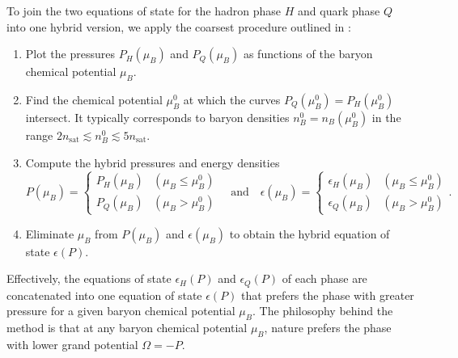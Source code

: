 To join the two equations of state for the hadron phase $H$ and quark phase $Q$ into one hybrid version,
we apply the coarsest procedure outlined in \cite[section V-C]{ref:quark_star_review}:
\begin{enumerate}
\item \label{step:hybrid:one}%
      Plot the pressures $P_H(\mu_B)$ and $P_Q(\mu_B)$ as functions of the baryon chemical potential $\mu_B$.
\item \label{step:hybrid:two}%
      Find the chemical potential $\mu_B^0$ at which the curves $P_Q(\mu_B^0) = P_H(\mu_B^0)$ intersect.
      It typically corresponds to baryon densities $n_B^0 = n_B(\mu_B^0)$ in the range $2 n_\text{sat} \lesssim n_B^0 \lesssim 5 n_\text{sat}$.
\item \label{step:hybrid:three}%
      Compute the hybrid pressures and energy densities
      \begin{equation}
          P(\mu_B) = \begin{cases} P_H(\mu_B) & (\mu_B \leq \mu_B^0) \\ P_Q(\mu_B) & (\mu_B > \mu_B^0)  \end{cases}
          \quad \text{and} \quad
          \epsilon(\mu_B) = \begin{cases} \epsilon_H(\mu_B) & (\mu_B \leq \mu_B^0) \\ \epsilon_Q(\mu_B) & (\mu_B > \mu_B^0) \end{cases}.
      \label{eq:hybrid:pressure_energy_density}
      \end{equation}
\item \label{step:hybrid:four}%
      Eliminate $\mu_B$ from $P(\mu_B)$ and $\epsilon(\mu_B)$ to obtain the hybrid equation of state $\epsilon(P)$.
\end{enumerate}
Effectively, the equations of state $\epsilon_H(P)$ and $\epsilon_Q(P)$ of each phase are concatenated into one equation of state $\epsilon(P)$
that prefers the phase with greater pressure for a given baryon chemical potential $\mu_B$.
The philosophy behind the method is that at any baryon chemical potential $\mu_B$,
nature prefers the phase with lower grand potential $\Omega = -P$.


